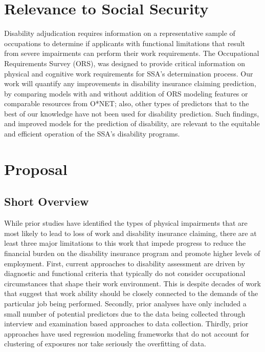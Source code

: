 \documentclass[letter]{article}
\begin{document}
\section{Relevance to Social Security}
Disability adjudication requires information on a representative sample of occupations to determine if applicants with functional limitations that result from severe impairments can perform their work requirements.  The Occupational Requirements Survey (ORS)\cite{orsDOL},  was designed to provide critical information on physical and cognitive work requirements for SSA's determination process.  Our work will quantify any improvements in disability insurance claiming prediction, by comparing models with and without addition of ORS modeling features or comparable resources from O*NET; also, other types of predictors that to the best of our knowledge have not been used for disability prediction. Such findings, and improved models for the prediction of disability, are relevant to the equitable and efficient operation of the SSA's disability programs.    

\section{Proposal}
\subsection{Short Overview}
While prior studies have identified the types of physical impairments that are most likely to lead to loss of work\cite{rehkopf2017impact} and disability insurance claiming\cite{benitez1999empirical}, there are at least three major limitations to this work that impede progress to reduce the financial burden on the disability insurance program and promote higher levels of employment. First, current approaches to disability assessment are driven by diagnostic and functional criteria that typically do not consider occupational circumstances that shape their work environment\cite{pmid25042994,pmid15157280}. This is despite decades of work that suggest that work ability should be closely connected to the demands of the particular job being performed\cite{rehkopf2017impact}. Secondly, prior analyses have only included a small number of potential predictors due to the data being collected through interview and examination based approaches to data collection\cite{cutler2013health}. Thirdly, prior approaches have used regression modeling frameworks that do not account for clustering of exposures nor take seriously the overfitting of data. 
\end{document}
